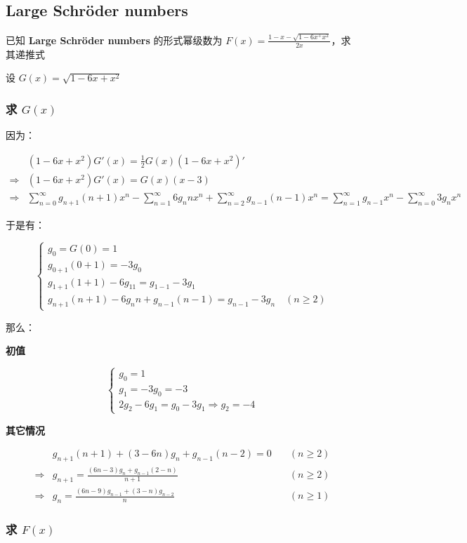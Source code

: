 \documentclass[UTF8]{article}
\begin{document}
\subsection{Large Schröder numbers}

已知 \textbf{Large Schröder numbers} 的形式幂级数为 $F(x)=\frac{1-x-\sqrt{1-6x^+x^2}}{2x}$，求其递推式

设 $G(x)=\sqrt{1-6x+x^2}$

\subsubsection{求 $G(x)$}

因为：

$$
\begin{aligned}
&(1-6x+x^2)G'(x)=\frac{1}{2}G(x)(1-6x+x^2)' \\
\Rightarrow &(1-6x+x^2)G'(x)=G(x)(x-3) \\
\Rightarrow &\sum_{n=0}^{\infty}g_{n+1}(n+1)x^{n}-\sum_{n=1}^{\infty}6g_{n}nx^n+\sum_{n=2}^{\infty}g_{n-1}(n-1)x^n=\sum_{n=1}^{\infty}g_{n-1}x^n-\sum_{n=0}^{\infty} 3g_nx^n
\end{aligned}
$$

于是有：

$$
\begin{cases}
g_0=G(0)=1 \\
g_{0+1}(0+1)=-3g_0 \\
g_{1+1}(1+1)-6g_11=g_{1-1}-3g_1 \\
g_{n+1}(n+1)-6g_nn+g_{n-1}(n-1)=g_{n-1}-3g_n \quad (n \ge 2)
\end{cases}
$$

那么：

\textbf{初值}

$$
\begin{cases}
g_0=1 \\
g_1=-3g_0=-3 \\
2g_2-6g_1=g_0-3g_1 \Rightarrow g_2=-4
\end{cases}
$$

\textbf{其它情况}

$$
\begin{aligned}
&g_{n+1}(n+1)+(3-6n)g_n+g_{n-1}(n-2)=0 \quad & (n \ge 2) \\
\Rightarrow &g_{n+1}=\frac{(6n-3)g_n+g_{n-1}(2-n)}{n+1} \quad & (n \ge 2) \\
\Rightarrow &g_{n}=\frac{(6n-9)g_{n-1}+(3-n)g_{n-2}}{n} \quad & (n \ge 1)
\end{aligned}
$$

\subsubsection{求 $F(x)$}
\end{document}
